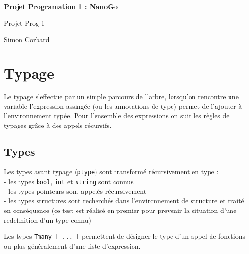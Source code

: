 \documentclass[9pt,a4paper]{article}
\begin{document}
\begin{titlepage}

\vspace{1cm}

	\begin{center}

    \huge{\textbf{Projet Programation 1 : NanoGo}}

		\vspace{5mm} %

		\begin{large}

		Projet Prog 1

		\vspace{5mm}

		Simon Corbard

		\end{large}

	\end{center}

\vfill

\tableofcontents

\end{titlepage}

\section{Typage}

Le typage s'effectue par un simple parcours de l'arbre, lorsqu'on rencontre une variable l'expression assingée (ou les annotations de type) permet de l'ajouter à l'environnement typée. Pour l'ensemble des expressions on suit les règles de typages grâce à des appels récursifs.

\subsection{Types}

Les types avant typage (\verb|ptype|) sont transformé récursivement en type : \\
 - les types \verb|bool|, \verb|int| et \verb|string| sont connus \\
 - les types pointeurs sont appelés récursivement \\
 - les types structures sont recherchés dans l'environnement de structure et traité en conséquence (ce test est réalisé en premier pour prevenir la situation d'une redefinition d'un type connu)

Les types \verb|Tmany [ ... ]| permettent de désigner le type d'un appel de fonctions ou plus généralement d'une liste d'expression.
\end{document}
